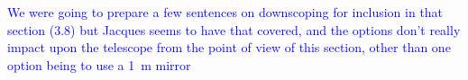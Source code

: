 \documentclass[11pt,a4paper]{article}
\newcommand{\comblue}[1]{\textcolor{blue}{#1}}
\begin{document}
\comblue{We were going to prepare a few sentences on downscoping for inclusion in that section (3.8) but Jacques seems to have that covered, and the options don't really impact upon the telescope from the point of view of this section, other than one option being to use a 1~m mirror}
\end{document}
